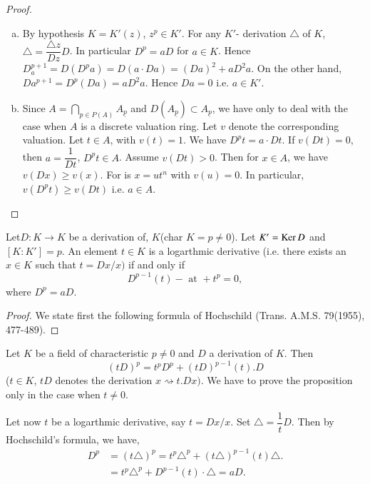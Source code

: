 \begin{proof}
\begin{enumerate}[(a)]
\item By hypothesis $K = K' (z)$, $z^p \in K'$. For any $K'$-
  derivation $\triangle$ of $K$, $\triangle = \dfrac{\triangle
    z}{D z} D$. In particular $D^p = a D$ for $a  \in
  K$. Hence $D_a^{p+1} = D(D^p a) = D(a \cdot Da) = (Da)^2 + aD^2 a$. On
  the other hand, $Da^{p+1} = D^p (Da) = a D^2 a$. Hence $Da = 0 $
  i.e. $a \in K'$. 

\item Since $A = \bigcap\limits_{p \in P (A)}
  A_{\underline{p}}$ and $D(A_{\underline{p}}) \subset
  A_{\underline{p}}$, we have only to deal with the case when $A$ is a
  discrete valuation ring. Let $v$ denote the corresponding
  valuation. Let $t \in A$, with $v(t) = 1$. We have $D^p t =
  a \cdot Dt$. If $v(Dt) = 0$, then $a = \dfrac{1}{Dt}$, $D^p t \in A$. Assume
  $v(Dt) > 0$. Then for $x \in A$, we have $v(Dx) \ge v(x)$. For is $x
  = u t^n$ with $v(u) = 0$. In particular, $v(D^p t) \ge v(Dt)$
  i.e. $a \in A$.  
\end{enumerate}
\end{proof}  
      
\begin{prop}\label{chap3:prop3.2} %
Let\pageoriginale $D : K \to K$ be a derivation of, $K$(char $K = p
\neq 
  0$). Let $K' = \operatorname{Ker} D$ and $[K : K'] = p$. An element $t \in K$ is a
  logarthmic derivative (i.e. there exists an $x \in K$ such that $t =
  D x/x)$ if and only if
$$
 D^{p-1} (t) - \text{ at } + t^p = 0,
$$
where $D^p = aD$.
    \end{prop}  
      
    \begin{proof}
We state first the following formula of Hochschild
(Trans. A.M.S. 79(1955), 477-489). 
    \end{proof}    
    
    \noindent
Let $K$ be a field of characteristic $p \neq 0$ and $D$ a derivation
of $K$. Then 
   $$
   (t D)^p = t^p D^p + (tD)^{p -1} (t). D
   $$
($t \in K$, $t D$ denotes the derivation $x \rightsquigarrow
t. Dx)$. We have to prove the proposition only in the case when $t
\neq 0$. 
    
    Let now $t$ be a logarthmic derivative, say $t = Dx/x$. Set
    $\triangle = \dfrac{1}{t} D$. Then by Hochschild's formula, we
    have, 
    \begin{align*}
D^p & = (t \triangle)^p = t^p \triangle^p + (t \triangle)^{p -1}
(t) \triangle.\\ 
& = t^p \triangle^p + D^{p-1} (t) \cdot  \triangle = aD. 
    \end{align*}    
    
